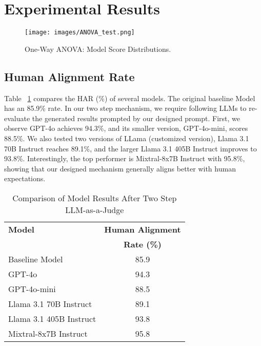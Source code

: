 \section{Experimental Results}


\begin{figure*}[!hbt]\footnotesize
\centering
\texttt{[image: images/ANOVA\_test.png]}
\caption{One-Way ANOVA: Model Score Distributions.}
\label{fig:anova_violin}
\end{figure*}

\subsection{Human Alignment Rate}

 Table ~\ref{tab:model_results} compares the HAR (\%) of several models. The original baseline Model has an 85.9\% rate. In our two step mechanism, we require following LLMs to re-evaluate the generated results prompted by our designed prompt.
First, we observe GPT-4o achieves 94.3\%, and its smaller version, GPT-4o-mini, scores 88.5\%. We also tested two versions of LLama (customized version), Llama 3.1 70B Instruct reaches 89.1\%, and the larger Llama 3.1 405B Instruct improves to 93.8\%. Interestingly, the top performer is Mixtral-8x7B Instruct with 95.8\%, showing that our designed mechanism generally aligns better with human expectations.



\begin{table}[ht]\footnotesize
\centering

\centering
\begin{tabular}{|l|c|}
\hline
\textbf{\centering Model} & \textbf{Human Alignment} \\ 
                          & \textbf{Rate (\%)}       \\ \hline
Baseline Model          & 85.9                     \\ \hline
GPT-4o                    & 94.3                     \\ \hline
GPT-4o-mini               & 88.5                     \\ \hline
Llama 3.1 70B Instruct     & 89.1                     \\ \hline
Llama 3.1 405B Instruct    & 93.8                     \\ \hline
Mixtral-8x7B Instruct      & 95.8                     \\ \hline
\end{tabular}
\caption{Comparison of Model Results After Two Step LLM-as-a-Judge}
\label{tab:model_results}
\end{table}



